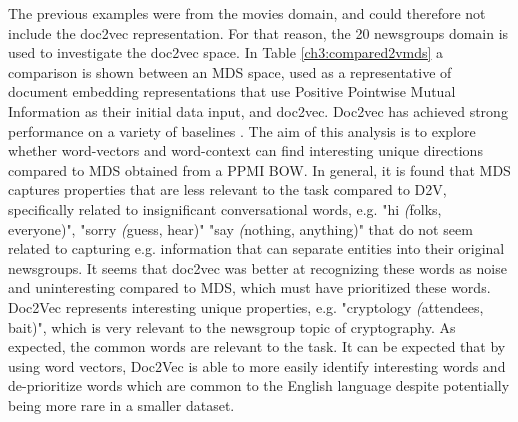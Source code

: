 The previous examples were from the movies domain, and could therefore not  include the doc2vec representation. For that reason, the 20 newsgroups domain is used to investigate the doc2vec space. In Table \ref{ch3:compared2vmds} a comparison is shown between an MDS space, used as a representative of document embedding representations that use Positive Pointwise Mutual Information as their initial data input, and doc2vec. Doc2vec has achieved strong performance on a variety of baselines \cite{Taddy2015}.  The aim of this analysis is to explore whether  word-vectors and word-context can find interesting unique directions compared to MDS obtained from a PPMI BOW. In general, it is found that MDS captures  properties that are less relevant to the task compared to D2V, specifically related to insignificant conversational words, e.g. "hi \textit({folks, everyone)}", "sorry \textit({guess, hear)}" "say \textit({nothing, anything)}" that do not seem related to capturing e.g. information that can separate entities into their original newsgroups. It seems that doc2vec was better at recognizing these words as noise and uninteresting compared to MDS, which must have prioritized these words. Doc2Vec represents interesting unique properties, e.g. "cryptology \textit({attendees, bait)}", which is very relevant to the  newsgroup topic of cryptography. As expected, the common words are relevant to the task. It can be expected that by using word vectors, Doc2Vec is able to more easily identify interesting words and de-prioritize words which are common to the English language despite potentially being more rare in a smaller dataset.

